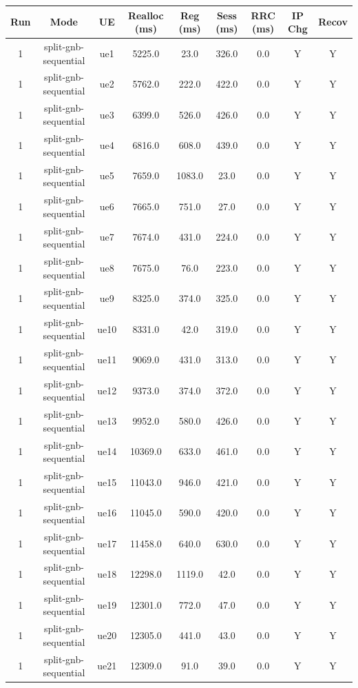 \begin{table}[ht]
\centering
\begin{tabular}{|c|c|c|c|c|c|c|c|c|}
\hline
Run & Mode & UE & Realloc (ms) & Reg (ms) & Sess (ms) & RRC (ms) & IP Chg & Recov \\
\hline
1 & split-gnb-sequential & ue1 & 5225.0 & 23.0 & 326.0 & 0.0 & Y & Y \\
1 & split-gnb-sequential & ue2 & 5762.0 & 222.0 & 422.0 & 0.0 & Y & Y \\
1 & split-gnb-sequential & ue3 & 6399.0 & 526.0 & 426.0 & 0.0 & Y & Y \\
1 & split-gnb-sequential & ue4 & 6816.0 & 608.0 & 439.0 & 0.0 & Y & Y \\
1 & split-gnb-sequential & ue5 & 7659.0 & 1083.0 & 23.0 & 0.0 & Y & Y \\
1 & split-gnb-sequential & ue6 & 7665.0 & 751.0 & 27.0 & 0.0 & Y & Y \\
1 & split-gnb-sequential & ue7 & 7674.0 & 431.0 & 224.0 & 0.0 & Y & Y \\
1 & split-gnb-sequential & ue8 & 7675.0 & 76.0 & 223.0 & 0.0 & Y & Y \\
1 & split-gnb-sequential & ue9 & 8325.0 & 374.0 & 325.0 & 0.0 & Y & Y \\
1 & split-gnb-sequential & ue10 & 8331.0 & 42.0 & 319.0 & 0.0 & Y & Y \\
1 & split-gnb-sequential & ue11 & 9069.0 & 431.0 & 313.0 & 0.0 & Y & Y \\
1 & split-gnb-sequential & ue12 & 9373.0 & 374.0 & 372.0 & 0.0 & Y & Y \\
1 & split-gnb-sequential & ue13 & 9952.0 & 580.0 & 426.0 & 0.0 & Y & Y \\
1 & split-gnb-sequential & ue14 & 10369.0 & 633.0 & 461.0 & 0.0 & Y & Y \\
1 & split-gnb-sequential & ue15 & 11043.0 & 946.0 & 421.0 & 0.0 & Y & Y \\
1 & split-gnb-sequential & ue16 & 11045.0 & 590.0 & 420.0 & 0.0 & Y & Y \\
1 & split-gnb-sequential & ue17 & 11458.0 & 640.0 & 630.0 & 0.0 & Y & Y \\
1 & split-gnb-sequential & ue18 & 12298.0 & 1119.0 & 42.0 & 0.0 & Y & Y \\
1 & split-gnb-sequential & ue19 & 12301.0 & 772.0 & 47.0 & 0.0 & Y & Y \\
1 & split-gnb-sequential & ue20 & 12305.0 & 441.0 & 43.0 & 0.0 & Y & Y \\
1 & split-gnb-sequential & ue21 & 12309.0 & 91.0 & 39.0 & 0.0 & Y & Y \\

\end{tabular}
\end{table}
